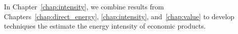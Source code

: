 In Chapter~\ref{chap:intensity}, 
we combine results from Chapters~\ref{chap:direct_energy}, 
\ref{chap:intensity}, and~\ref{chap:value}
to develop techniques the estimate the energy intensity
of economic products.









%
%




